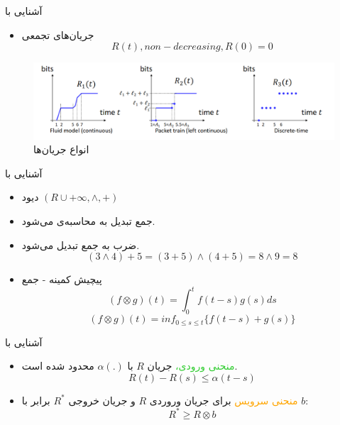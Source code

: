 \documentclass[dvipsnames]{beamer}
\makeatletter
\newcommand{\RTList}{\raggedleft\rightskip\@totalleftmargin}
\makeatother
\begin{document}
\begin{persian}
	\begin{frame}{آشنایی با }
		\begin{itemize}\RTList{}
			\justifying%
			\item جریان‌های تجمعی
			\[ R(t), non-decreasing, R(0) = 0 \]
		\end{itemize}
		\begin{center}\begin{figure}
			\includegraphics[scale=0.4]{images/flow-models.png}
			\caption{انواع جریان‌ها}
		\end{figure}\end{center}
	\end{frame}

	\begin{frame}{آشنایی با }
		\begin{itemize}\RTList{}
			\justifying%
			\item دیود \((R \cup +\infty, \wedge, +)\)
			\item جمع تبدیل به محاسبه‌ی  می‌شود.
			\item ضرب به جمع تبدیل می‌شود.
			\[ (3\wedge4) + 5 = (3 + 5) \wedge (4 + 5) = 8 \wedge 9 = 8 \]
			\item پیچیش کمینه - جمع
			\[ (f \otimes g)(t) = \int_{0}^{t} f(t-s)g(s)ds \]
			\[ (f \otimes g)(t) = inf_{0 \le s \le t} \{ f(t-s) + g(s) \}\]
		\end{itemize}
	\end{frame}

	\begin{frame}{آشنایی با }
		\begin{itemize}\RTList{}
			\justifying%
		  \item \textcolor{LimeGreen}{منحنی ورودی،}
				جریان \(R\) با \( \alpha(.) \) محدود شده است.
			\[ R(t) - R(s) \le \alpha(t - s) \]
		  \item \textcolor{Orange}{منحنی سرویس}
				برای جریان وروردی \(R\) و جریان خروجی \(R^{*}\) برابر با \(b\):
			\[ R^{*} \ge R \otimes b \]
		\end{itemize}
	\end{frame}


\end{persian}
\end{document}
